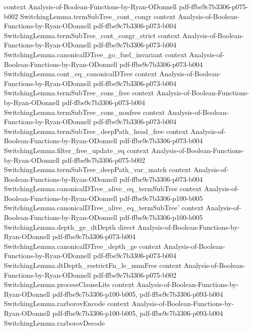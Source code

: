 \begin{lemma}
  {context}
  {Analysis-of-Boolean-Functions-by-Ryan-ODonnell}
  {pdf-ffbe9c7b3306-p075-b002}
\proofstep
  {SwitchingLemma.termSubTree_cont_congr}
  {context}
  {Analysis-of-Boolean-Functions-by-Ryan-ODonnell}
  {pdf-ffbe9c7b3306-p073-b004}
\proofstep
  {SwitchingLemma.termSubTree_cont_congr_strict}
  {context}
  {Analysis-of-Boolean-Functions-by-Ryan-ODonnell}
  {pdf-ffbe9c7b3306-p073-b004}
\proofstep
  {SwitchingLemma.canonicalDTree_go_fuel_invariant}
  {context}
  {Analysis-of-Boolean-Functions-by-Ryan-ODonnell}
  {pdf-ffbe9c7b3306-p073-b004}
\proofstep
  {SwitchingLemma.cont_eq_canonicalDTree}
  {context}
  {Analysis-of-Boolean-Functions-by-Ryan-ODonnell}
  {pdf-ffbe9c7b3306-p073-b004}
\proofstep
  {SwitchingLemma.termSubTree_cons_free}
  {context}
  {Analysis-of-Boolean-Functions-by-Ryan-ODonnell}
  {pdf-ffbe9c7b3306-p073-b004}
\proofstep
  {SwitchingLemma.termSubTree_cons_nonfree}
  {context}
  {Analysis-of-Boolean-Functions-by-Ryan-ODonnell}
  {pdf-ffbe9c7b3306-p073-b004}
\proofstep
  {SwitchingLemma.termSubTree_deepPath_head_free}
  {context}
  {Analysis-of-Boolean-Functions-by-Ryan-ODonnell}
  {pdf-ffbe9c7b3306-p073-b004}
\proofstep
  {SwitchingLemma.filter_free_update_eq}
  {context}
  {Analysis-of-Boolean-Functions-by-Ryan-ODonnell}
  {pdf-ffbe9c7b3306-p075-b002}
\proofstep
  {SwitchingLemma.termSubTree_deepPath_var_match}
  {context}
  {Analysis-of-Boolean-Functions-by-Ryan-ODonnell}
  {pdf-ffbe9c7b3306-p073-b004}
\proofstep
  {SwitchingLemma.canonicalDTree_alive_eq_termSubTree}
  {context}
  {Analysis-of-Boolean-Functions-by-Ryan-ODonnell}
  {pdf-ffbe9c7b3306-p100-b005}
\proofstep
  {SwitchingLemma.canonicalDTree_alive_eq_termSubTree'}
  {context}
  {Analysis-of-Boolean-Functions-by-Ryan-ODonnell}
  {pdf-ffbe9c7b3306-p100-b005}
\proofstep
  {SwitchingLemma.depth_ge_dtDepth}
  {direct}
  {Analysis-of-Boolean-Functions-by-Ryan-ODonnell}
  {pdf-ffbe9c7b3306-p073-b004}
\proofstep
  {SwitchingLemma.canonicalDTree_depth_ge}
  {context}
  {Analysis-of-Boolean-Functions-by-Ryan-ODonnell}
  {pdf-ffbe9c7b3306-p073-b004}
\proofstep
  {SwitchingLemma.dtDepth_restrictFn_le_numFree}
  {context}
  {Analysis-of-Boolean-Functions-by-Ryan-ODonnell}
  {pdf-ffbe9c7b3306-p075-b002}
\proofstep
  {SwitchingLemma.processClauseLits}
  {context}
  {Analysis-of-Boolean-Functions-by-Ryan-ODonnell}
  {pdf-ffbe9c7b3306-p100-b005,
    pdf-ffbe9c7b3306-p093-b004}
\proofstep
  {SwitchingLemma.razborovEncode}
  {context}
  {Analysis-of-Boolean-Functions-by-Ryan-ODonnell}
  {pdf-ffbe9c7b3306-p100-b005,
    pdf-ffbe9c7b3306-p093-b004}
\proofstep
  {SwitchingLemma.razborovDecode}

\end{lemma}
